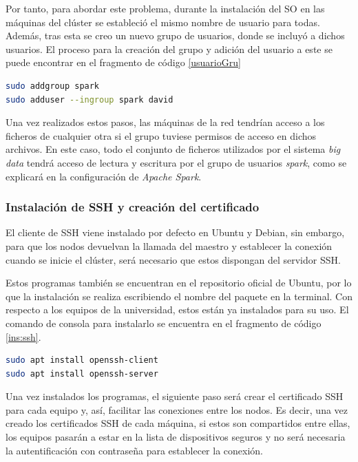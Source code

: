 Por tanto, para abordar este problema, durante la instalación del \gls{SO} en las máquinas del clúster se estableció el mismo nombre de usuario para todas. Además, tras esta se creo un nuevo grupo de usuarios, donde se incluyó a dichos usuarios. El proceso para la creación del grupo y adición del usuario a este se puede encontrar en el fragmento de código \ref{usuarioGru}

\clearpage
\begin{lstlisting}[label=usuarioGru,language=sh,frame=single,caption=Creación de grupo común y adición del usuario del sistema a este.]
sudo addgroup spark
sudo adduser --ingroup spark david
\end{lstlisting}

Una vez realizados estos pasos, las máquinas de la red tendrían acceso a los ficheros de cualquier otra si el grupo tuviese permisos de acceso en dichos archivos. En este caso, todo el conjunto de ficheros utilizados por el sistema \textit{big data} tendrá acceso de lectura y escritura por el grupo de usuarios \textit{spark}, como se explicará en la configuración de \textit{Apache Spark}.

\subsubsection{Instalación de \gls{SSH} y creación del certificado \label{insSSH}}
El cliente de \gls{SSH} viene instalado por defecto en Ubuntu y Debian, sin embargo, para que los nodos devuelvan la llamada del maestro y establecer la conexión cuando se inicie el clúster, será necesario que estos dispongan del servidor \gls{SSH}. 

Estos programas también se encuentran en el repositorio oficial de Ubuntu, por lo que la instalación se realiza escribiendo el nombre del paquete en la terminal. Con respecto a los equipos de la universidad, estos están ya instalados para su uso. El comando de consola para instalarlo se encuentra en el fragmento de código \ref{ins:ssh}.

\begin{lstlisting}[label=ins:ssh,language=sh,frame=single,caption=Instalación del cliente y el servidor de \gls{SSH}.]
sudo apt install openssh-client
sudo apt install openssh-server
\end{lstlisting}

Una vez instalados los programas, el siguiente paso será crear el certificado \gls{SSH} para cada equipo y, así, facilitar las conexiones entre los nodos. Es decir, una vez creado los certificados \gls{SSH} de cada máquina, si estos son compartidos entre ellas, los equipos pasarán a estar en la lista de dispositivos seguros y no será necesaria la autentificación con contraseña para establecer la conexión.


